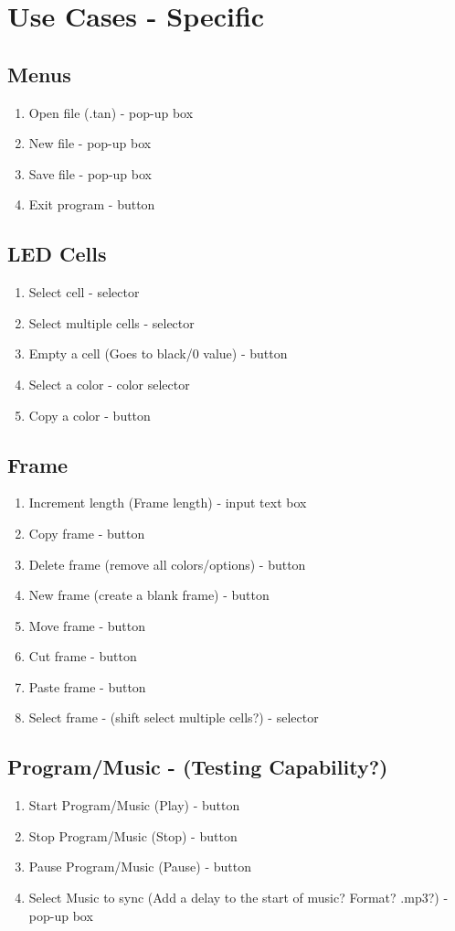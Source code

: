 \documentclass[12pt,a4paper]{article}
\begin{document}
\section*{Use Cases - Specific}	

\subsection*{Menus}
\begin{enumerate}
	\item Open file (.tan) - pop-up box
	\item New file - pop-up box
	\item Save file - pop-up box
	\item Exit program - button
\end{enumerate}

\subsection*{LED Cells}
\begin{enumerate}
	\item Select cell - selector
	\item Select multiple cells - selector
	\item Empty a cell (Goes to black/0 value) - button
	\item Select a color - color selector
	\item Copy a color - button
\end{enumerate}

\subsection*{Frame}
\begin{enumerate}
	\item Increment length (Frame length) - input text box
	\item Copy frame - button
	\item Delete frame (remove all colors/options) - button
	\item New frame (create a blank frame) - button 
	\item Move frame - button
	\item Cut frame - button
	\item Paste frame - button
	\item Select frame - (shift select multiple cells?) - selector
\end{enumerate}

\subsection*{Program/Music - (Testing Capability?)}
\begin{enumerate}
	\item Start Program/Music (Play) - button
	\item Stop Program/Music (Stop) - button
	\item Pause Program/Music (Pause) - button 
	\item Select Music to sync (Add a delay to the start of music? Format? .mp3?) - pop-up box
\end{enumerate}
\end{document}
